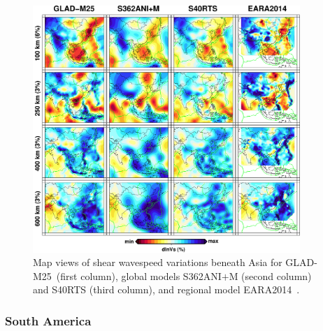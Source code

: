 \documentclass[extra,mreferee]{gji}
\begin{document}
\begin{figure}
\includegraphics[width=0.9\textwidth]{figures/depth_slice/asia_vs.pdf}
  \caption{Map views of shear wavespeed variations beneath Asia for GLAD-M25~(first column),
  global models S362ANI$+$M (second column) and S40RTS (third column), and regional model EARA2014~\citep[last column;][]{chen2015multiparameter}.}
\label{fig:asia-vs}
\centering
\end{figure}

\subsubsection{South America}
\end{document}
